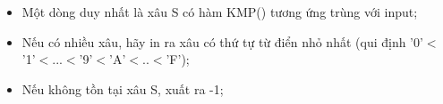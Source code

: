\begin{itemize}
	\item     Một dòng duy nhất là xâu S có hàm KMP() tương ứng trùng với input;   
	\item     Nếu có nhiều xâu, hãy in ra xâu có thứ tự từ điển nhỏ nhất (qui định '0'$<$'1'$<$...$<$'9'$<$'A'$<$..$<$'F');   
	\item     Nếu không tồn tại xâu S, xuất ra -1;   
\end{itemize}

\